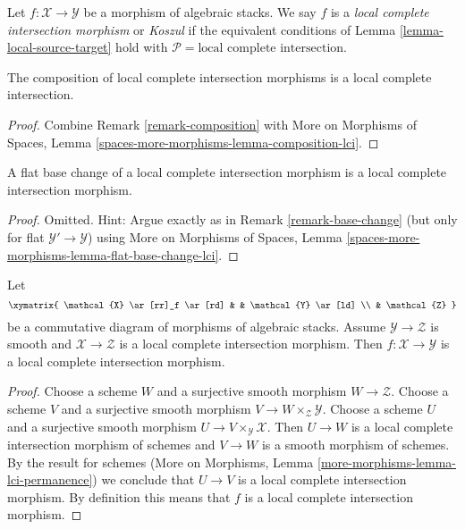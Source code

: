 \begin{definition}
\label{definition-lci}
Let $f : \mathcal{X} \to \mathcal{Y}$ be a morphism of algebraic stacks.
We say $f$ is a {\it local complete intersection morphism} or {\it Koszul}
if the equivalent conditions of
Lemma \ref{lemma-local-source-target}
hold with $\mathcal{P} = \text{local complete intersection}$.
\end{definition}

\begin{lemma}
\label{lemma-composition-lci}
The composition of local complete intersection morphisms is
a local complete intersection.
\end{lemma}

\begin{proof}
Combine
Remark \ref{remark-composition}
with
More on Morphisms of Spaces, Lemma
\ref{spaces-more-morphisms-lemma-composition-lci}.
\end{proof}

\begin{lemma}
\label{lemma-flat-base-change-lci}
A flat base change of a local complete intersection morphism is
a local complete intersection morphism.
\end{lemma}

\begin{proof}
Omitted. Hint: Argue exactly as in Remark \ref{remark-base-change}
(but only for flat $\mathcal{Y}' \to \mathcal{Y}$) using
More on Morphisms of Spaces, Lemma
\ref{spaces-more-morphisms-lemma-flat-base-change-lci}.
\end{proof}

\begin{lemma}
\label{lemma-lci-permanence}
Let
$$
\xymatrix{
\mathcal{X} \ar[rr]_f \ar[rd] & & \mathcal{Y} \ar[ld] \\
& \mathcal{Z}
}
$$
be a commutative diagram of morphisms of algebraic stacks.
Assume $\mathcal{Y} \to \mathcal{Z}$ is smooth and
$\mathcal{X} \to \mathcal{Z}$ is a local complete intersection morphism.
Then $f : \mathcal{X} \to \mathcal{Y}$ is a
local complete intersection morphism.
\end{lemma}

\begin{proof}
Choose a scheme $W$ and a surjective smooth morphism $W \to \mathcal{Z}$.
Choose a scheme $V$ and a surjective smooth morphism
$V \to W \times_\mathcal{Z} \mathcal{Y}$.
Choose a scheme $U$ and a surjective smooth morphism
$U \to V \times_\mathcal{Y} \mathcal{X}$.
Then $U \to W$ is a local complete intersection morphism of schemes and
$V \to W$ is a smooth morphism of schemes. By the result for schemes
(More on Morphisms, Lemma \ref{more-morphisms-lemma-lci-permanence})
we conclude that $U \to V$ is a local complete intersection morphism.
By definition this means that $f$ is a local complete intersection morphism.
\end{proof}















